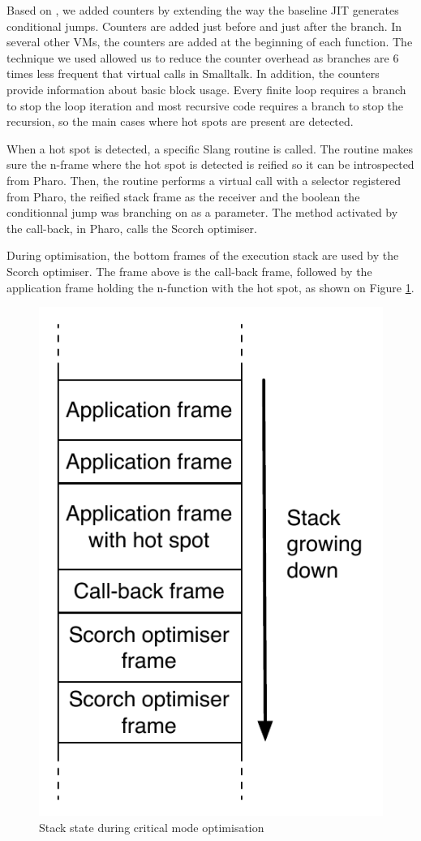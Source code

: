 \documentclass[a4paper,12pt,twoside]{../includes/ThesisStyle}
\begin{document}

Based on \cite{Arn02}, we added counters by extending the way the baseline JIT generates conditional jumps. Counters are added just before and just after the branch. In several other VMs, the counters are added at the beginning of each function. The technique we used allowed us to reduce the counter overhead as branches are 6 times less frequent that virtual calls in Smalltalk. In addition, the counters provide information about basic block usage. Every finite loop requires a branch to stop the loop iteration and most recursive code requires a branch to stop the recursion, so the main cases where hot spots are present are detected.

When a hot spot is detected, a specific Slang routine is called. The routine makes sure the n-frame where the hot spot is detected is reified so it can be introspected from Pharo. Then, the routine performs a virtual call with a selector registered from Pharo, the reified stack frame as the receiver and the boolean the conditionnal jump was branching on as a parameter. The method activated by the call-back, in Pharo, calls the Scorch optimiser.

During optimisation, the bottom frames of the execution stack are used by the Scorch optimiser. The frame above is the call-back frame, followed by the application frame holding the n-function with the hot spot, as shown on Figure \ref{fig:HotSpotCallBackStack}.

\begin{figure}[h!]
    \begin{center}
        \includegraphics[width=0.35\linewidth]{HotSpotCallBackStack}
        \caption{Stack state during critical mode optimisation}
        \label{fig:HotSpotCallBackStack}
    \end{center}
\end{figure}
\end{document}
